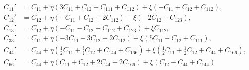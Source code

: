 \documentclass[showpacs,aps,floatfix,prb,reprint,superscriptaddress]{revtex4-1}
\begin{document}
\begin{widetext}
\begin{subequations}
\label{eqn:Cprime_Cubic} 
\begin{align}
        C_{11}' &=C_{11} + \eta \left( 3C_{11} + C_{12} +C_{111} + C_{112}\right) + \xi \left(-C_{11} + C_{12} + C_{112} \right),\\
        C_{12}' &=C_{12} + \eta \left(-C_{11} + C_{12}  + 2C_{112}\right) + \xi \left(-2C_{12} + C_{123} \right),\\
				C_{13}' &=C_{12} + \eta \left(-C_{11}-C_{12} + C_{112} + C_{123} \right) + \xi C_{112},\\
				C_{33}' &=C_{11} + \eta \left( -3C_{11}+3C_{12} + 2 C_{112} \right) + \xi \left( 5C_{11} - C_{12} + C_{111}\right),\\
				C_{44}' &=C_{44} + \eta \left(\frac{1}{2} C_{11} + \frac{3}{2} C_{12} + C_{144} + C_{166} \right) + \xi \left(\frac{1}{2} C_{11} + \frac{1}{2} C_{12} + C_{44} + C_{166}  \right),\\
				C_{66}' &=C_{44} + \eta \left( C_{11} + C_{12} + 2C_{44} + 2C_{166} \right) + \xi \left(C_{12} - C_{44} + C_{144} \right)
\end{align}
\end{subequations}
\end{widetext} 

\end{document}
